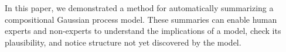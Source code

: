 \documentclass{article} %
\begin{document}
In this paper, we demonstrated a method for automatically summarizing a compositional Gaussian process model.  These summaries can enable human experts and non-experts to understand the implications of a model, check its plausibility, and notice structure not yet discovered by the model.




\end{document}
